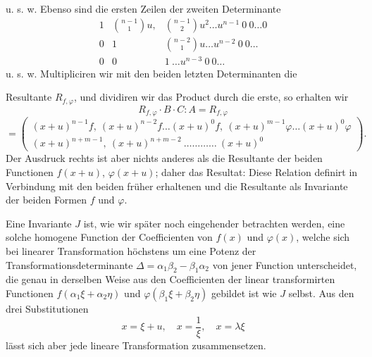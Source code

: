 u. s. w. Ebenso sind die ersten Zeilen der zweiten Determinante
\[
\begin{array}{lll}
1 & \binom{n-1}{1}u, & \binom{n-1}{2}u^2\ldots u^{n-1}\ 0\ 0\ldots 0\\
0 & 1 & \binom{n-2}{1}u\ldots u^{n-2}\ 0\ 0\ldots\\
0 & 0 & 1\ \ldots u^{n-3}\ 0\ 0\ldots
\end{array}
\]
u. s. w. Multipliciren wir mit den beiden letzten Determinanten die


Resultante $R_{f,\varphi}$, und dividiren wir das Product durch die
erste, so erhalten wir
\[
R_{f,\varphi}\cdot B\cdot C : A = R_{f,\varphi}
\]
\[
= \left(\begin{array}{l}
(x+u)^{n-1}f,\ (x+u)^{n-2}f\ldots(x+u)^0f,\ (x+u)^{m-1}\varphi\ldots(x+u)^0\varphi\\[2pt]
(x+u)^{n+m-1},\ (x+u)^{n+m-2}\ \ldots\ldots\ldots\ldots\ (x+u)^0
\end{array}\right).
\]
Der Ausdruck rechts ist aber nichts anderes als die Resultante der
beiden Functionen $f(x+u)$, $\varphi(x+u)$; daher das Resultat:
Diese Relation definirt in Verbindung mit den beiden fr\"uher
erhaltenen
und
die Resultante als Invariante der beiden Formen $f$ und $\varphi$.

Eine Invariante $J$ ist, wie wir sp\"ater noch eingehender betrachten
werden, eine solche homogene Function der Coefficienten von $f(x)$ und
$\varphi(x)$, welche sich bei linearer Transformation h\"ochstens um
eine Potenz der Transformationsdeterminante
$\Delta = \alpha_1\beta_2 - \beta_1\alpha_2$ von jener Function
unterscheidet, die genau in derselben Weise aus den Coefficienten der
linear transformirten Functionen $f(\alpha_1\xi+\alpha_2\eta)$ und
$\varphi(\beta_1\xi+\beta_2\eta)$ gebildet ist wie $J$ selbst. Aus den
drei Substitutionen
\[
x = \xi + u,\quad x = \frac{1}{\xi},\quad x = \lambda\xi
\]
l\"asst sich aber jede lineare Transformation zusammensetzen.

